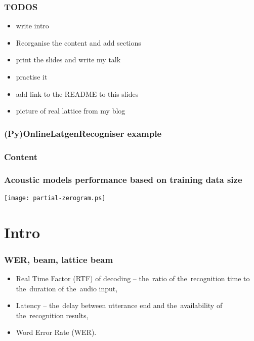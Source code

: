 

\maketitle


\begin{frame}\frametitle{TODOS} 
    \begin{itemize}
        \item write intro
        \item Reorganise the content and add sections
        \item print the slides and write my talk
        \item practise it
        \item add link to the README to this slides
        \item picture of real lattice from my blog
    \end{itemize}
\end{frame}


\begin{frame}\frametitle{(Py)OnlineLatgenRecogniser example} 
    
\end{frame}


\begin{frame} \frametitle{Content} \tableofcontents \end{frame}

\begin{frame}\frametitle{Acoustic models performance based on training data size} 
    \texttt{[image: partial-zerogram.ps]}
\end{frame}

\section{Intro} 

\begin{frame}\frametitle{WER, beam, lattice beam} 
    \begin{itemize}
        \item Real Time Factor (RTF) of decoding -- the~ratio of the~recognition time to the~duration of the~audio input,
        \item Latency -- the~delay between utterance end and the~availability of the~recognition results,
        \item Word Error Rate (WER).
    \end{itemize}
\end{frame}


